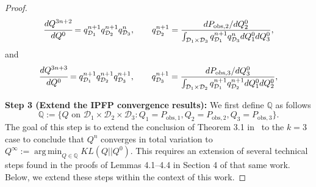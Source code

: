 \documentclass{article}
\newcommand{\q}{\mathbb{Q}}
\newcommand{\initmeas}{P_{\text{init}}}
\DeclareMathOperator*{\argmin}{arg\,min}
\begin{document}
\begin{proof}
\begin{equation*}
\end{equation*}
\begin{equation*}
\cfrac{dQ^{3n+2}}{dQ^{0}} = q^{n+1}_{\mathcal{D}_{1}}q^{n+1}_{\mathcal{D}_{2}}q^{n}_{\mathcal{D}_{3}}, \qquad q^{n+1}_{\mathcal{D}_{2}} = \frac{dP_{\text{obs},2}/dQ_{2}^{0}}{\int_{\mathcal{D}_{1} \times \mathcal{D}_{3}}q^{n+1}_{\mathcal{D}_{1}}q^{n}_{\mathcal{D}_{3}} dQ^{0}_{1}dQ^{0}_{3}}, \end{equation*}
and 
\begin{equation*}
    \cfrac{dQ^{3n+3}}{dQ^{0}} = q^{n+1}_{\mathcal{D}_{1}}q^{n+1}_{\mathcal{D}_{2}}q^{n+1}_{\mathcal{D}_{3}}, \qquad q^{n+1}_{\mathcal{D}_{3}} = \frac{dP_{\text{obs},3}/dQ_{3}^{0}}{\int_{\mathcal{D}_{1} \times \mathcal{D}_{2}}q^{n+1}_{\mathcal{D}_{1}}q^{n+1}_{\mathcal{D}_{2}} dQ^{0}_{1}dQ^{0}_{2}},
\end{equation*}

{\bf Step 3 (Extend the IPFP convergence results):}
We first define $\q$ as follows
\begin{equation*}
    \q := \{Q \text{ on } \mathcal{D}_{1} \times \mathcal{D}_{2} \times \mathcal{D}_{3}: Q_1 = P_{\text{obs},1}, Q_2 = P_{\text{obs},2}, Q_3 = P_{\text{obs},3}\}.
\end{equation*}
The goal of this step is to extend the conclusion of Theorem 3.1 in~\cite{Ruschendorf1995} to the $k=3$ case to conclude that $Q^n$ converges in total variation to $Q^\infty:=\argmin_{Q\in\mathbb{Q}} KL(Q||Q^0)$. 
This requires an extension of several technical steps found in the proofs of Lemmas 4.1--4.4 in Section 4 of that same work.
Below, we extend these steps within the context of this work.


\end{proof}
\end{document}
